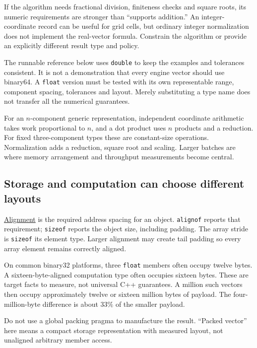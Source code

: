 If the algorithm needs fractional division, finiteness checks and square roots, its numeric requirements are stronger than ``supports addition.'' An integer-coordinate record can be useful for grid cells, but ordinary integer normalization does not implement the real-vector formula. Constrain the algorithm or provide an explicitly different result type and policy.

The runnable reference below uses \texttt{double} to keep the examples and tolerances consistent. It is not a demonstration that every engine vector should use binary64. A \texttt{float} version must be tested with its own representable range, component spacing, tolerances and layout. Merely substituting a type name does not transfer all the numerical guarantees.

For an \(n\)-component generic representation, independent coordinate arithmetic takes work proportional to \(n\), and a dot product uses \(n\) products and a reduction. For fixed three-component types these are constant-size operations. Normalization adds a reduction, square root and scaling. Larger batches are where memory arrangement and throughput measurements become central.

\subsection{Storage and computation can choose different layouts}\label{02-foundations-ii-ch037-storage-and-computation-can-choose-different-layouts}

\hyperref[02-foundations-ii-ch037-storage-and-computation-can-choose-different-layouts]{Alignment} is the required address spacing for an object. \texttt{alignof} reports that requirement; \texttt{sizeof} reports the object size, including padding. The array stride is \texttt{sizeof} its element type. Larger alignment may create tail padding so every array element remains correctly aligned.

On common binary32 platforms, three \texttt{float} members often occupy twelve bytes. A sixteen-byte-aligned computation type often occupies sixteen bytes. These are target facts to measure, not universal C++ guarantees. A million such vectors then occupy approximately twelve or sixteen million bytes of payload. The four-million-byte difference is about \(33\%\) of the smaller payload.

Do not use a global packing pragma to manufacture the result. ``Packed vector'' here means a compact storage representation with measured layout, not unaligned arbitrary member access.

